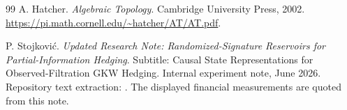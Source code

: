 \documentclass[11pt,a4paper]{article}
\numberwithin{equation}{section}
\theoremstyle{definition}
\theoremstyle{remark}
\begin{document}
\begin{thebibliography}{99}
A. Hatcher. \emph{Algebraic Topology}.
Cambridge University Press, 2002.
\url{https://pi.math.cornell.edu/~hatcher/AT/AT.pdf}.

P. Stojkovi\'{c}. \emph{Updated Research Note: Randomized-Signature
Reservoirs for Partial-Information Hedging}.
Subtitle: Causal State Representations for Observed-Filtration GKW Hedging.
Internal experiment note, June 2026.
Repository text extraction:
.
The displayed financial measurements are quoted from this note.

\end{thebibliography}
\end{document}
